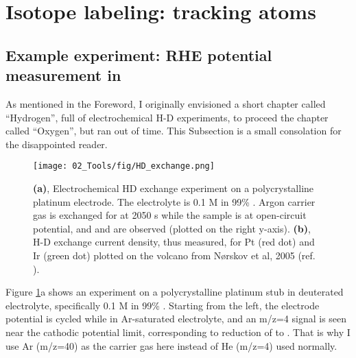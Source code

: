 \section{Isotope labeling: tracking atoms}



\subsection{Example experiment: RHE potential measurement in }\label{subsec:isotope_RHE}
As mentioned in the Foreword, I originally envisioned a short chapter called ``Hydrogen'', full of electrochemical H-D experiments, to proceed the chapter called ``Oxygen'', but ran out of time. This Subsection is a small consolation for the disappointed reader.

\begin{figure}[h!]
	\centering
	\texttt{[image: 02\_Tools/fig/HD\_exchange.png]}
	\caption{\textbf{(a)}, Electrochemical HD exchange experiment on a polycrystalline platinum electrode. The electrolyte is 0.1 M  in 99\% . Argon carrier gas is exchanged for  at 2050 s while the sample is at open-circuit potential, and  and  are observed (plotted on the right y-axis). \textbf{(b)}, H-D exchange current density, thus measured, for Pt (red dot) and Ir (green dot) plotted on the volcano from N\o rskov et al, 2005 (ref. \cite{Nørskov2005a}).}
	\label{fig:HD}
\end{figure}

Figure \ref{fig:HD}a shows an experiment on a polycrystalline platinum stub in deuterated electrolyte, specifically 0.1 M  in 99\% . Starting from the left, the electrode potential is cycled while in Ar-saturated electrolyte, and an m/z=4 signal is seen near the cathodic potential limit, corresponding to reduction of  to . That is why I use Ar (m/z=40) as the carrier gas here instead of He (m/z=4) used normally. 

